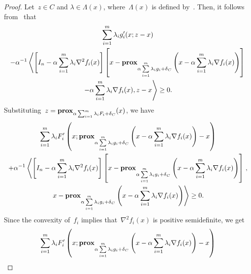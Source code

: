 \documentclass[../../main]{subfiles}
\begin{document}
                           \begin{proof}
                               Let~$z \in C$ and $\lambda \in \Lambda(x)$, where~$\Lambda(x)$ is defined by~.
                               Then, it follows from~ that
                               \begin{multline}
                                   \sum_{i = 1}^{m} \lambda_i g_i'(x; z - x) \\
                                   - \alpha^{-1} \left\langle \left[ I_n - \alpha \sum_{i = 1}^{m} \lambda_i \nabla^2 f_i(x) \right] \left[x - \operatorname{\mathbf{prox}}_{\alpha \sum\limits_{i = 1}^{m} \lambda_i g_i + \operatorname{\delta}_C} \left( x - \alpha \sum_{i = 1}^{m} \lambda_i \nabla f_i(x) \right) \right] \right.\\
                                   \left. - \alpha \sum_{i = 1}^{m} \lambda_i \nabla f_i(x) , z - x \right\rangle \ge 0
                               .\end{multline}
                               Substituting~$z = \operatorname{\mathbf{prox}}_{\alpha \sum_{i = 1}^{m} \lambda_i F_i + \operatorname{\delta}_C}(x)$, we have
                               \begin{multline}
                                   \sum_{i = 1}^{m} \lambda_i F_i' \left(x; \operatorname{\mathbf{prox}}_{\alpha \sum\limits_{i = 1}^{m} \lambda_i g_i + \operatorname{\delta}_C}\left( x - \alpha \sum_{i = 1}^{m} \lambda_i \nabla f_i(x) \right) - x \right) \\
                                   + \alpha^{-1} \left\langle \left[ I_n - \alpha \sum_{i = 1}^{m} \lambda_i \nabla^2 f_i(x) \right] \left[ x - \operatorname{\mathbf{prox}}_{\alpha \sum\limits_{i = 1}^{m} \lambda_i g_i + \operatorname{\delta}_C}\left( x - \alpha \sum_{i = 1}^{m} \lambda_i \nabla f_i(x) \right) \right]  \right. , \\
                                   \left. x - \operatorname{\mathbf{prox}}_{\alpha \sum\limits_{i = 1}^{m} \lambda_i g_i + \operatorname{\delta}_C}\left( x - \alpha \sum_{i = 1}^{m} \lambda_i \nabla f_i(x) \right) \right\rangle \ge 0
                               .\end{multline}
                               Since the convexity of~$f_i$ implies that~$\nabla^2 f_i(x)$ is positive semidefinite, we get
                               \begin{multline}
                                   \sum_{i = 1}^{m} \lambda_i F_i' \left(x; \prox_{\alpha \sum\limits_{i = 1}^{m} \lambda_i g_i + \indicator_C}\left( x - \alpha \sum_{i = 1}^{m} \lambda_i \nabla f_i(x) \right) - x \right) \\

\end{multline}
\end{proof}
\end{document}

